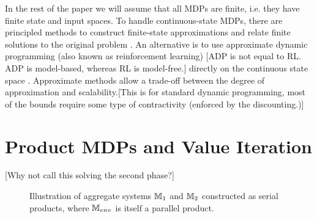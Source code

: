 \documentclass[conference]{IEEEtran}
\newcommand{\red}[1]{{\color{red} #1 }}
\newcommand{\sofie}[1]{{\color{orange}#1}}
\begin{document}
In the rest of the paper we will assume that all MDPs are finite, i.e. they have finite state and input spaces. To handle continuous-state MDPs, there are principled methods to construct finite-state approximations and relate finite solutions to the original problem \cite{Zamani2015,Haesaert2017}. An alternative is to use approximate dynamic programming (also known as reinforcement learning) \sofie{[ADP is not equal to RL. ADP is model-based, whereas RL is model-free.]} directly on the continuous state space \cite{Powell2011}. Approximate methods allow a trade-off between the degree of approximation and scalability.\sofie{[This is for standard dynamic programming, most of the bounds require some type of contractivity (enforced by the discounting.)]}


\section{Product MDPs and Value Iteration}
\red{[Why not call this solving the second phase?] }
\begin{figure}
\begin{center}
\end{center}
  \caption{Illustration of aggregate systems $\mathbb{M}_1$ and $\mathbb{M}_2$ constructed as serial products, where $\mathbb{M}_{env}$ is itself a parallel product.}
  \label{fig:agg}
\end{figure}
\end{document}
